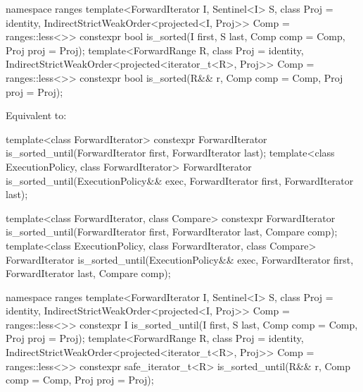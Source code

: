 \begin{addedblock}
%
\begin{itemdecl}
namespace ranges {
  template<ForwardIterator I, Sentinel<I> S, class Proj = identity,
      IndirectStrictWeakOrder<projected<I, Proj>> Comp = ranges::less<>>
    constexpr bool is_sorted(I first, S last, Comp comp = Comp{}, Proj proj = Proj{});
  template<ForwardRange R, class Proj = identity,
      IndirectStrictWeakOrder<projected<iterator_t<R>, Proj>> Comp = ranges::less<>>
    constexpr bool is_sorted(R&& r, Comp comp = Comp{}, Proj proj = Proj{});
}
\end{itemdecl}

\begin{itemdescr}
\pnum
\effects Equivalent to: 
\end{itemdescr}
\end{addedblock}

%
\begin{itemdecl}
template<class ForwardIterator>
  constexpr ForwardIterator
    is_sorted_until(ForwardIterator first, ForwardIterator last);
template<class ExecutionPolicy, class ForwardIterator>
  ForwardIterator
    is_sorted_until(ExecutionPolicy&& exec,
                    ForwardIterator first, ForwardIterator last);

template<class ForwardIterator, class Compare>
  constexpr ForwardIterator
    is_sorted_until(ForwardIterator first, ForwardIterator last,
                    Compare comp);
template<class ExecutionPolicy, class ForwardIterator, class Compare>
  ForwardIterator
    is_sorted_until(ExecutionPolicy&& exec,
                    ForwardIterator first, ForwardIterator last,
                    Compare comp);
\end{itemdecl}
\begin{addedblock}
\begin{itemdecl}
namespace ranges {
  template<ForwardIterator I, Sentinel<I> S, class Proj = identity,
      IndirectStrictWeakOrder<projected<I, Proj>> Comp = ranges::less<>>
    constexpr I is_sorted_until(I first, S last, Comp comp = Comp{}, Proj proj = Proj{});
  template<ForwardRange R, class Proj = identity,
      IndirectStrictWeakOrder<projected<iterator_t<R>, Proj>> Comp = ranges::less<>>
    constexpr safe_iterator_t<R>
      is_sorted_until(R&& r, Comp comp = Comp{}, Proj proj = Proj{});
}
\end{itemdecl}
\end{addedblock}

